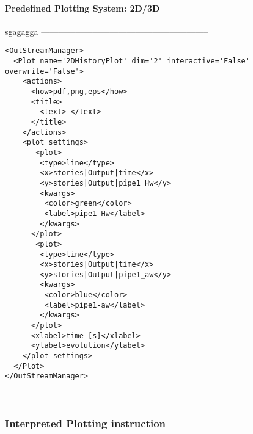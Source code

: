 \paragraph{Predefined Plotting System: 2D/3D \label{sec:23Dplotting}} 
sgagagga
-----------------------------------------------------------
\begin{lstlisting}[style=XML]
<OutStreamManager>
  <Plot name='2DHistoryPlot' dim='2' interactive='False' overwrite='False'>
    <actions>
      <how>pdf,png,eps</how>
      <title>
        <text> </text>
      </title>
    </actions>
    <plot_settings>
       <plot>
        <type>line</type>
        <x>stories|Output|time</x>
        <y>stories|Output|pipe1_Hw</y> 
        <kwargs>
         <color>green</color>
         <label>pipe1-Hw</label>
        </kwargs>
      </plot>
       <plot>
        <type>line</type>
        <x>stories|Output|time</x>
        <y>stories|Output|pipe1_aw</y> 
        <kwargs>
         <color>blue</color>
         <label>pipe1-aw</label>
        </kwargs>
      </plot>
      <xlabel>time [s]</xlabel>
      <ylabel>evolution</ylabel>
    </plot_settings>
  </Plot>
</OutStreamManager>
\end{lstlisting}
-----------------------------------------------------------

\subsubsection{Interpreted Plotting instruction \label{sec:Interpretedplotting}}











